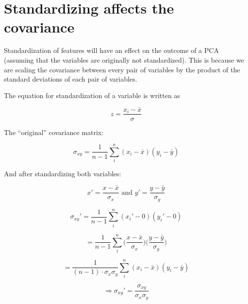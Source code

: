 \documentclass[fleqn]{article}
\begin{document}
\section{Standardizing affects the covariance}
\label{standardizingaffectsthecovariance}

Standardization of features will have an effect on the outcome of a PCA (assuming that the variables are originally not standardized). This is because we are scaling the covariance between every pair of variables by the product of the standard deviations of each pair of variables.

The equation for standardization of a variable is written as 

\begin{equation} z = \frac{x_i - \bar{x}}{\sigma} \end{equation}

The ``original'' covariance matrix:

\begin{equation} \sigma_{xy} = \frac{1}{n-1} \sum_{i}^{n} (x_i - \bar{x})(y_i - \bar{y})   \end{equation}

And after standardizing both variables:

\begin{equation} x' = \frac{x - \bar{x}}{\sigma_x} \text{ and } y' =\frac{y - \bar{y}}{\sigma_y} \end{equation}

\begin{equation} \sigma_{xy}' =  \frac{1}{n-1} \sum_{i}^{n} (x_i' - 0)(y_i' - 0)   \end{equation}

\begin{equation}  =  \frac{1}{n-1} \sum_{i}^{n} \bigg(\frac{x - \bar{x}}{\sigma_x}\bigg)\bigg(\frac{y - \bar{y}}{\sigma_y}\bigg)   \end{equation}

\begin{equation}   = \frac{1}{(n-1) \cdot \sigma_x \sigma_y} \sum_{i}^{n} (x_i - \bar{x})(y_i - \bar{y})   \end{equation}

\begin{equation} \Rightarrow \sigma_{xy}' = \frac{\sigma_{xy}}{\sigma_x \sigma_y} \end{equation}
\end{document}
